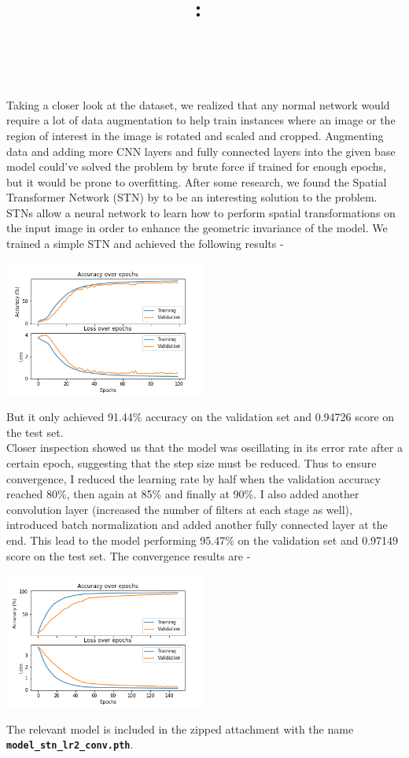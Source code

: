 \documentclass{article}
\title{
    \vspace{2in}
    \textmd{\textbf{\hmwkClass:\ \hmwkTitle}}\\
    \normalsize\vspace{0.1in}\small{\hmwkDueDate}
    \vspace{3in}
}
\author{\hmwkAuthorName \\ \authorID}
\date{}
\begin{document}
\maketitle

\pagebreak
Taking a closer look at the dataset, we realized that any normal network would require a lot of data augmentation to help train instances where an image or the region of interest in the image is rotated and scaled and cropped. Augmenting data and adding more CNN layers and fully connected layers into the given base model could've solved the problem by brute force if trained for enough epochs, but it would be prone to overfitting. After some research, we found the Spatial Transformer Network (STN) by \cite{jaderberg2015spatial} to be an interesting solution to the problem. STNs allow a neural network to learn how to perform spatial transformations on the input image in order to enhance the geometric invariance of the model. 
We trained a simple STN and achieved the following results -
\begin{center}
\includegraphics[width=0.5\textwidth]{model_stn.png}
\end{center}
But it only achieved 91.44\% accuracy on the validation set and 0.94726 score on the test set.\\
Closer inspection showed us that the model was oscillating in its error rate after a certain epoch, suggesting that the step size must be reduced. Thus to ensure convergence, I reduced the learning rate by half when the validation accuracy reached 80\%, then again at 85\% and finally at 90\%. I also added another convolution layer (increased the number of filters at each stage as well), introduced batch normalization and added another fully connected layer at the end. This lead to the model performing 95.47\% on the validation set and 0.97149 score on the test set. The convergence results are -
\begin{center}
\includegraphics[width=0.5\textwidth]{model_stn_lr2_conv.png}
\end{center}
The relevant model is included in the zipped attachment with the name \textbf{\texttt{model\_stn\_lr2\_conv.pth}}.




\end{document}
